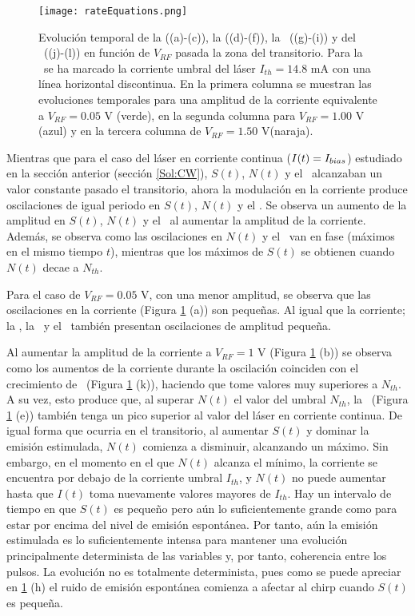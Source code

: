 			\begin{figure}[H]
				\centering
				\texttt{[image: rateEquations.png]}
				\caption{\label{Img:rateEquations}Evolución temporal de la \I ((a)-(c)), la \s ((d)-(f)), la \n\ ((g)-(i)) y del \chirp\ ((j)-(l)) en funci\'on de $V_{RF}$ pasada la zona del transitorio. Para la \I\ se ha marcado la corriente umbral del l\'aser $I_{th} = 14.8$ mA con una l\'inea horizontal discontinua. En la primera columna se muestran las evoluciones temporales para una amplitud de la corriente equivalente a $V_{RF} = 0.05$ V (verde), en la segunda columna para $V_{RF} = 1.00$ V (azul) y en la tercera columna de $V_{RF} = 1.50$ V(naraja).}	
			\end{figure}

		Mientras que para el caso del l\'aser en corriente continua ($I(t) = I_{bias}$) estudiado en la secci\'on anterior (secci\'on \ref{Sol:CW}), $S(t)$, $N(t)$ y el \chirp\ alcanzaban un valor constante pasado el transitorio, ahora la modulación en la corriente produce oscilaciones de igual periodo en $S(t)$, $N(t)$ y el \chirp. Se observa un aumento de la amplitud en $S(t)$, $N(t)$ y el \chirp\ al aumentar la amplitud de la corriente. Adem\'as, se observa como las oscilaciones en $N(t)$ y el \chirp\ van en fase (m\'aximos en el mismo tiempo $t$), mientras que los m\'aximos de $S(t)$ se obtienen cuando $N(t)$ decae a $N_{th}$.
			
		Para el caso de $V_{RF} = 0.05$ V, con una menor amplitud, se observa que las oscilaciones en la corriente (Figura \ref{Img:rateEquations} (a)) son pequeñas. Al igual que la corriente; la \s, la \n\ y el \chirp\ tambi\'en presentan oscilaciones de amplitud pequeña.

		Al aumentar la amplitud de la corriente a $V_{RF} = 1$ V (Figura \ref{Img:rateEquations} (b)) se observa como los aumentos de la corriente durante la oscilaci\'on coinciden con el crecimiento de \n\ (Figura \ref{Img:rateEquations} (k)), haciendo que tome valores muy superiores a $N_{th}$. A su vez, esto produce que, al superar $N(t)$ el valor del umbral $N_{th}$, la \s\ (Figura \ref{Img:rateEquations} (e)) tambi\'en tenga un pico superior al valor del l\'aser en corriente continua. De igual forma que ocurria en el transitorio, al aumentar $S(t)$ y dominar la emisi\'on estimulada, $N(t)$ comienza a disminuir, alcanzando un m\'aximo. Sin embargo, en el momento en el que $N(t)$ alcanza el m\'inimo, la corriente se encuentra por debajo de la corriente umbral $I_{th}$, y $N(t)$ no puede aumentar hasta que $I(t)$ toma nuevamente valores mayores de $I_{th}$. Hay un intervalo de tiempo en que $S(t)$ es pequeño pero a\'un lo suficientemente grande como para estar por encima del nivel de emisi\'on espont\'anea. Por tanto, a\'un la emisi\'on estimulada es lo suficientemente intensa para mantener una evoluci\'on principalmente determinista de las variables y, por tanto, coherencia entre los pulsos. La evoluci\'on no es totalmente determinista, pues como se puede apreciar en \ref{Img:rateEquations} (h) el ruido de emisi\'on espont\'anea comienza a afectar al chirp cuando $S(t)$ es pequeña.
		
